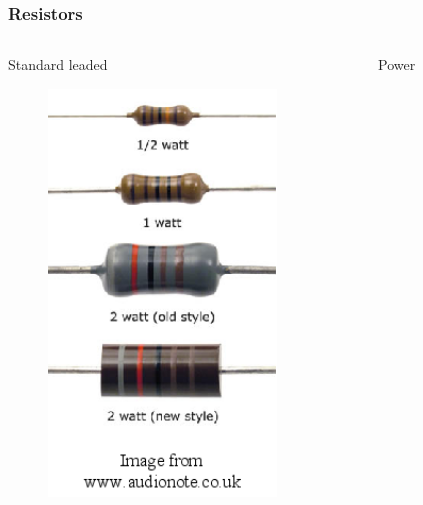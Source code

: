 \documentclass[beamer]{standalone}
\begin{document}
\begin{frame}
 \frametitle{Resistors}
 \begin{columns}[t]
  \begin{column}{.3\textwidth}
   Standard leaded
   \begin{figure}
   \includegraphics[width=0.85\textwidth]{./pics/resistors1.png}
   \end{figure}
  \end{column}
  \begin{column}{.3\textwidth}
   Power
   \begin{figure}

\end{figure}
\end{column}
\end{columns}
\end{frame}
\end{document}
